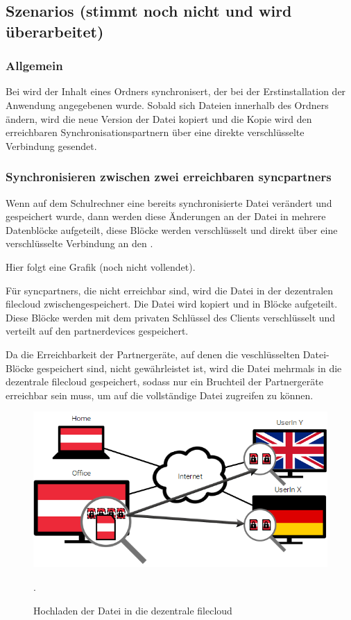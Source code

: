 \subsection{Szenarios (stimmt noch nicht und wird überarbeitet)}
\subsubsection{Allgemein}
Bei \sblit wird der Inhalt eines Ordners synchronisert, der bei der
Erstinstallation der Anwendung angegebenen wurde. Sobald sich Dateien innerhalb des Ordners
ändern, wird die neue Version der Datei kopiert und die Kopie wird den
erreichbaren Synchronisationspartnern über eine direkte verschlüsselte Verbindung
gesendet.

\subsubsection{Synchronisieren zwischen zwei erreichbaren \glspl{syncpartner}}
Wenn auf dem Schulrechner eine bereits synchronisierte Datei verändert und
gespeichert wurde, dann werden diese Änderungen an der Datei in mehrere Datenblöcke
aufgeteilt, diese Blöcke werden verschlüsselt und direkt über eine verschlüsselte
Verbindung an den .

Hier folgt eine Grafik (noch nicht vollendet).

Für \glspl{syncpartner}, die nicht erreichbar sind, wird die Datei in der dezentralen
\gls{filecloud} zwischengespeichert. Die Datei wird kopiert und in Blöcke
aufgeteilt. Diese Blöcke werden mit dem privaten Schlüssel des Clients
verschlüsselt und verteilt auf den \glspl{partnerdevice} gespeichert.

Da die Erreichbarkeit der Partnergeräte, auf denen die veschlüsselten
Datei-Blöcke gespeichert sind, nicht gewährleistet ist, wird die Datei mehrmals
in die dezentrale \gls{filecloud} gespeichert, sodass nur ein Bruchteil der
Partnergeräte erreichbar sein muss, um auf die vollständige Datei zugreifen zu
können.

\begin{figure}[h]
	\centering
  \includegraphics[]{images/sblit_1}
  \caption{Hochladen der Datei in die dezentrale \gls{filecloud}}.
\end{figure}

